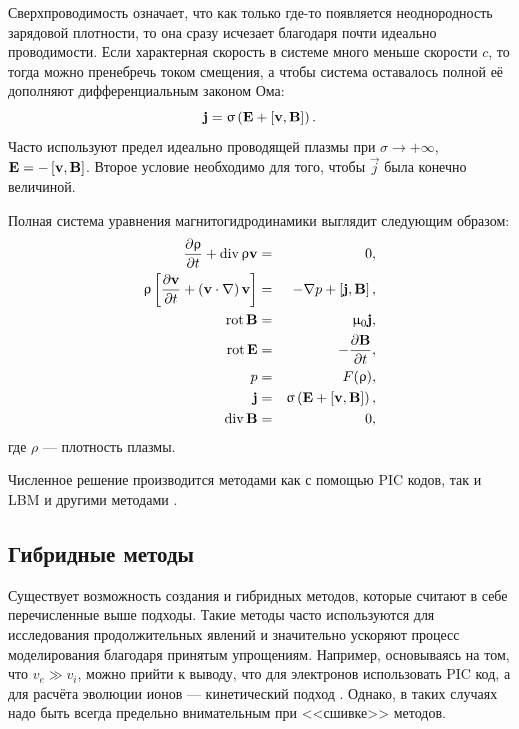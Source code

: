 Сверхпроводимость означает, что как только где-то появляется неоднородность зарядовой плотности, то она сразу исчезает благодаря почти идеально проводимости. Если характерная скорость в системе много меньше скорости $c$, то тогда можно пренебречь током смещения, а чтобы система оставалось полной её дополняют дифференциальным законом Ома:
\begin{equation}
\mathbf{j} = \upsigma \left( \mathbf{E} + \left[ \mathbf{{v}},\mathbf{{B}} \right]  \right).
\end{equation}
Часто используют предел идеально проводящей плазмы при $\sigma \to + \infty$, $\mathbf{E} = - \left[ \mathbf{{v}},\mathbf{{B}} \right]$. Второе условие необходимо для того, чтобы $\vec{j}$ была конечно величиной.

Полная система уравнения магнитогидродинамики выглядит следующим образом:
\begin{eqnarray}
\frac{\partial {\uprho}}{\partial {t}} + \operatorname{div} \uprho \mathbf{v} &=& 0, \\
\uprho \left[  \frac{\partial {\mathbf{v}}}{\partial {t}} + \left( \mathbf{v} \cdot \nabla \right) \mathbf{v}  \right] &=& - \nabla p + \left[ \mathbf{{j}},\mathbf{{B}} \right], \\
\operatorname{rot} \mathbf{B} &=& \upmu_0 \mathbf{j}, \\
\operatorname{rot} \mathbf{E} &=& - \frac{\partial {\mathbf{B}}}{\partial {t}}, \\
p &=& F(\uprho) , \\
\mathbf{j} &=& \upsigma \left( \mathbf{E} + \left[ \mathbf{{v}},\mathbf{{B}} \right]  \right), \\
\operatorname{div} \mathbf{B} &=& 0,
\end{eqnarray}
где $\rho$ --- плотность плазмы.

Численное решение производится методами как с помощью PIC кодов, так и LBM \cite{Pattison2008}  и другими методами \cite{Galanin2014}.

\subsection{Гибридные методы}

Существует возможность создания и гибридных методов, которые считают в себе  перечисленные выше подходы. Такие методы часто используются для исследования продолжительных явлений и значительно ускоряют процесс моделирования благодаря принятым упрощениям. Например, основываясь на том, что $v_e \gg v_i$, можно прийти к выводу, что для электронов использовать PIC код, а для расчёта эволюции ионов --- кинетический подход \cite{Miloch2014}. Однако, в таких случаях надо быть всегда предельно внимательным при <<сшивке>> методов.


